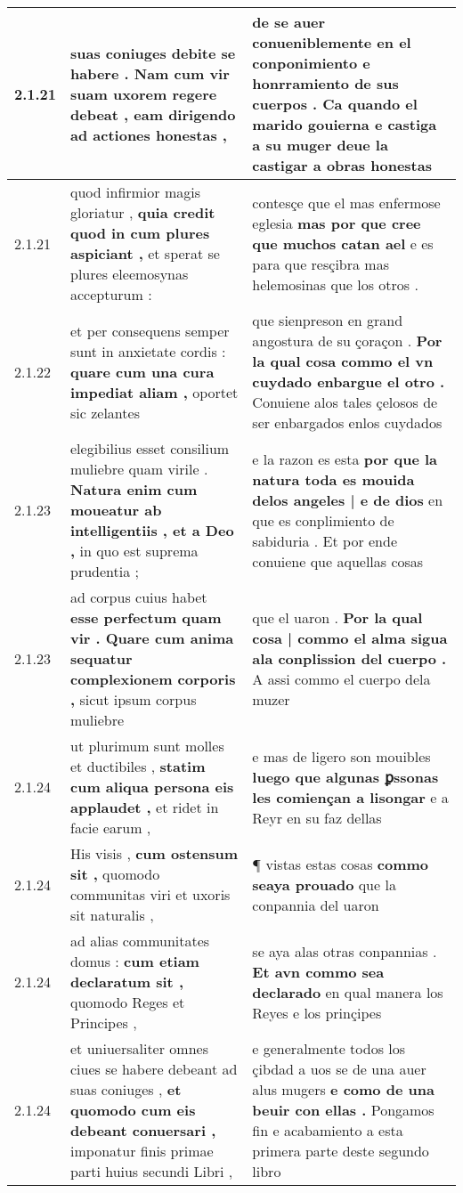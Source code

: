 \begin{tabular}{|p{1cm}|p{6.5cm}|p{6.5cm}|}
2.1.21 & suas coniuges debite se habere . \textbf{ Nam cum vir suam uxorem regere debeat , } eam dirigendo ad actiones honestas , & de se auer conueniblemente en el conponimiento e honrramiento de sus cuerpos . \textbf{ Ca quando el marido gouierna e castiga a su muger } deue la castigar a obras honestas \\\hline
2.1.21 & quod infirmior magis gloriatur , \textbf{ quia credit quod in cum plures aspiciant , } et sperat se plures eleemosynas accepturum : & contesçe que el mas enfermose eglesia \textbf{ mas por que cree que muchos catan ael } e es para que resçibra mas helemosinas que los otros . \\\hline
2.1.22 & et per consequens semper sunt in anxietate cordis : \textbf{ quare cum una cura impediat aliam , } oportet sic zelantes & que sienpreson en grand angostura de su çoraçon . \textbf{ Por la qual cosa commo el vn cuydado enbargue el otro . } Conuiene alos tales çelosos de ser enbargados enlos cuydados \\\hline
2.1.23 & elegibilius esset consilium muliebre quam virile . \textbf{ Natura enim cum moueatur ab intelligentiis , et a Deo , } in quo est suprema prudentia ; & e la razon es esta \textbf{ por que la natura toda es mouida delos angeles | e de dios } en que es conplimiento de sabiduria . Et por ende conuiene que aquellas cosas \\\hline
2.1.23 & ad corpus cuius habet \textbf{ esse perfectum quam vir . Quare cum anima sequatur complexionem corporis , } sicut ipsum corpus muliebre & que el uaron . \textbf{ Por la qual cosa | commo el alma sigua ala conplission del cuerpo . } A assi commo el cuerpo dela muzer \\\hline
2.1.24 & ut plurimum sunt molles et ductibiles , \textbf{ statim cum aliqua persona eis applaudet , } et ridet in facie earum , & e mas de ligero son mouibles \textbf{ luego que algunas ꝑssonas les comiençan a lisongar } e a Reyr en su faz dellas \\\hline
2.1.24 & His visis , \textbf{ cum ostensum sit , } quomodo communitas viri et uxoris sit naturalis , & ¶ vistas estas cosas \textbf{ commo seaya prouado } que la conpannia del uaron \\\hline
2.1.24 & ad alias communitates domus : \textbf{ cum etiam declaratum sit , } quomodo Reges et Principes , & se aya alas otras conpannias . \textbf{ Et avn commo sea declarado } en qual manera los Reyes e los prinçipes \\\hline
2.1.24 & et uniuersaliter omnes ciues se habere debeant ad suas coniuges , \textbf{ et quomodo cum eis debeant conuersari , } imponatur finis primae parti huius secundi Libri , & e generalmente todos los çibdad a uos se de una auer alus mugers \textbf{ e como de una beuir con ellas . } Pongamos fin e acabamiento a esta primera parte deste segundo libro \\\hline

\end{tabular}
